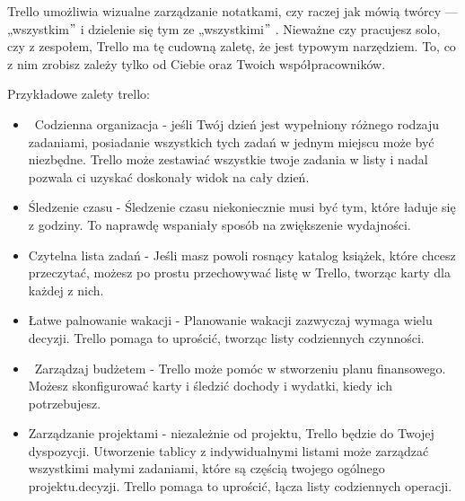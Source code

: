 \documentclass[12pt]{article}
\renewcommand{\_}{\kern-1.5pt\textunderscore\kern-1.5pt}
\begin{document}
\begin{adjustwidth}{1.0in}{0.0in}
Trello umożliwia wizualne zarządzanie notatkami, czy raczej jak mówią twórcy — „wszystkim$"$  i dzielenie się tym ze „wszystkimi$"$ . Nieważne czy pracujesz solo, czy z zespołem, Trello ma tę cudowną zaletę, że jest typowym narzędziem. To, co z nim zrobisz zależy tylko od Ciebie oraz Twoich współpracowników.\par

\end{adjustwidth}

\begin{adjustwidth}{1.0in}{0.0in}
Przykładowe zalety trello:\par

\end{adjustwidth}

\begin{itemize}
	\item  Codzienna organizacja - jeśli Twój dzień jest wypełniony różnego rodzaju zadaniami, posiadanie wszystkich tych zadań w jednym miejscu może być niezbędne. Trello może zestawiać wszystkie twoje zadania w listy i nadal pozwala ci uzyskać doskonały widok na cały dzień.\par

	\item Śledzenie czasu - Śledzenie czasu niekoniecznie musi być tym, które ładuje się z godziny. To naprawdę wspaniały sposób na zwiększenie wydajności.\par

	\item Czytelna lista zadań - Jeśli masz powoli rosnący katalog książek, które chcesz przeczytać, możesz po prostu przechowywać listę w Trello, tworząc karty dla każdej z nich.\par

	\item Łatwe palnowanie wakacji - Planowanie wakacji zazwyczaj wymaga wielu decyzji. Trello pomaga to uprościć, tworząc listy codziennych czynności.\par

	\item  Zarządzaj budżetem - Trello może pomóc w stworzeniu planu finansowego. Możesz skonfigurować karty i śledzić dochody i wydatki, kiedy ich potrzebujesz.\par

	\item Zarządzanie projektami - niezależnie od projektu, Trello będzie do Twojej dyspozycji. Utworzenie tablicy z indywidualnymi listami może zarządzać wszystkimi małymi zadaniami, które są częścią twojego ogólnego projektu.decyzji. Trello pomaga to uprościć, łącza listy codziennych operacji.
\end{itemize}\par
\end{document}
